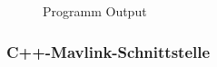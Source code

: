 \documentclass[12pt]{article} %
\begin{document}
		\begin{figure}[H]
			\centering
			\caption{Programm Output}
			\label{2}
		\end{figure}
	
	\subsubsection{C++-Mavlink-Schnittstelle}
	
\end{document}
